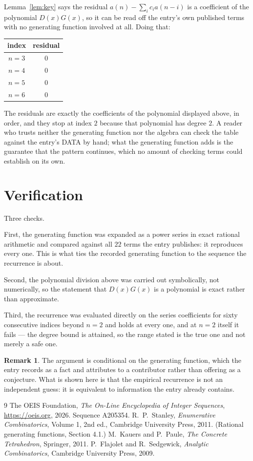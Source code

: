 \documentclass[11pt,a4paper]{article}
\theoremstyle{plain}
\theoremstyle{definition}
\newtheorem{remark}[theorem]{Remark}
\begin{document}
Lemma~\ref{lem:key} says the residual $a(n)-\sum_ic_ia(n-i)$ is a coefficient of the
polynomial $D(x)G(x)$, so it can be read off the entry's own published terms with no
generating function involved at all. Doing that:
\begin{center}
\begin{tabular}{cc}
index & residual \\ \hline
$n=3$ & $0$ \\
$n=4$ & $0$ \\
$n=5$ & $0$ \\
$n=6$ & $0$
\end{tabular}
\end{center}
The residuals are exactly the coefficients of the polynomial displayed above, in order, and
they stop at index $2$ because that polynomial has degree $2$. A reader who trusts
neither the generating function nor the algebra can check the table against the entry's DATA
by hand; what the generating function adds is the guarantee that the pattern continues, which
no amount of checking terms could establish on its own.

\section{Verification}

Three checks.

First, the generating function was expanded as a power series in exact rational arithmetic and
compared against all $22$ terms the entry publishes: it reproduces every one. This is
what ties the recorded generating function to the sequence the recurrence is about.

Second, the polynomial division above was carried out symbolically, not numerically, so the
statement that $D(x)G(x)$ is a polynomial is exact rather than approximate.

Third, the recurrence was evaluated directly on the series coefficients for sixty consecutive
indices beyond $n=2$ and holds at every one, and at $n=2$ itself it fails --- the
degree bound is attained, so the range stated is the true one and not merely a safe one.

\begin{remark}
The argument is conditional on the generating function, which the entry records as a fact and
attributes to a contributor rather than offering as a conjecture. What is shown here is that
the empirical recurrence is not an independent guess: it is equivalent to information the
entry already contains.
\end{remark}

\begin{thebibliography}{9}
 The OEIS Foundation, \emph{The On-Line Encyclopedia of Integer
Sequences}, \url{https://oeis.org}, 2026. Sequence A205354.
 R.~P.~Stanley, \emph{Enumerative Combinatorics}, Volume 1, 2nd ed.,
Cambridge University Press, 2011. (Rational generating functions, Section 4.1.)
 M.~Kauers and P.~Paule, \emph{The Concrete Tetrahedron}, Springer, 2011.
 P.~Flajolet and R.~Sedgewick, \emph{Analytic Combinatorics}, Cambridge
University Press, 2009.
\end{thebibliography}
\end{document}
